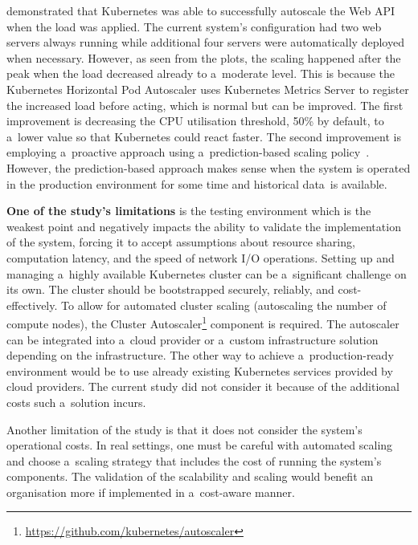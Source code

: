 \documentclass[12pt]{article}
\begin{document}
 demonstrated that Kubernetes was able to successfully autoscale the Web API when the load was applied. The current system's configuration had two web servers always running while additional four servers were automatically deployed when necessary. However, as seen from the plots, the scaling happened after the peak when the load decreased already to a~moderate level. This is because the Kubernetes Horizontal Pod Autoscaler uses Kubernetes Metrics Server to register the increased load before acting, which is normal but can be improved. The first improvement is decreasing the CPU utilisation threshold, 50\% by default, to a~lower value so that Kubernetes could react faster. The second improvement is employing a~proactive approach using a~prediction-based scaling policy~\cite{hu_kubernetes_2021}. However, the prediction-based approach makes sense when the system is operated in the production environment for some time and historical data~is available.

\textbf{One of the study's limitations} is the testing environment which is the weakest point and negatively impacts the ability to validate the implementation of the system, forcing it to accept assumptions about resource sharing, computation latency, and the speed of network I/O operations. Setting up and managing a~highly available Kubernetes cluster can be a~significant challenge on its own. The cluster should be bootstrapped securely, reliably, and cost-effectively. To allow for automated cluster scaling (autoscaling the number of compute nodes), the Cluster Autoscaler\footnote{\href{https://github.com/kubernetes/autoscaler}{https://github.com/kubernetes/autoscaler}} component is required. The autoscaler can be integrated into a~cloud provider or a~custom infrastructure solution depending on the infrastructure. The other way to achieve a~production-ready environment would be to use already existing Kubernetes services provided by cloud providers. The current study did not consider it because of the additional costs such a~solution incurs.

Another limitation of the study is that it does not consider the system's operational costs. In real settings, one must be careful with automated scaling and choose a~scaling strategy that includes the cost of running the system's components. The validation of the scalability and scaling would benefit an organisation more if implemented in a~cost-aware manner.
\end{document}
